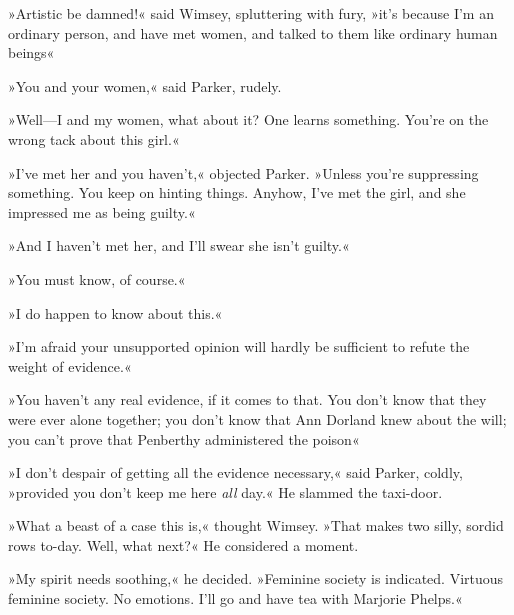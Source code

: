 »Artistic be damned!« said Wimsey, spluttering with fury, »it's because I'm an ordinary person, and have met women, and talked to them like ordinary human beings\longdash«

»You and your women,« said Parker, rudely.

»Well—I and my women, what about it? One learns something. You're on the wrong tack about this girl.«

»I've met her and you haven't,« objected Parker. »Unless you're suppressing something. You keep on hinting things. Anyhow, I've met the girl, and she impressed me as being guilty.«

»And I haven't met her, and I'll swear she isn't guilty.«

»You must know, of course.«

»I do happen to know about this.«

»I'm afraid your unsupported opinion will hardly be sufficient to refute the weight of evidence.«

»You haven't any real evidence, if it comes to that. You don't know that they were ever alone together; you don't know that Ann Dorland knew about the will; you can't prove that Penberthy administered the poison\longdash«

»I don't despair of getting all the evidence necessary,« said Parker, coldly, »provided you don't keep me here \textit{all} day.« He slammed the taxi-door.

»What a beast of a case this is,« thought Wimsey. »That makes two silly, sordid rows to-day. Well, what next?« He considered a moment.

»My spirit needs soothing,« he decided. »Feminine society is indicated. Virtuous feminine society. No emotions. I'll go and have tea with Marjorie Phelps.«